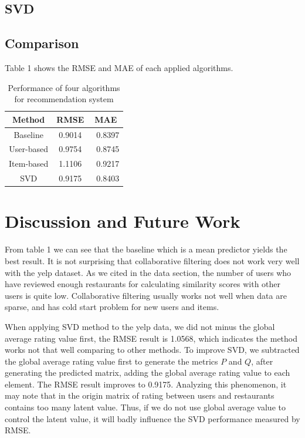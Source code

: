 \documentclass{llncs}
\begin{document}
\subsection{SVD}
\subsection{Comparison}
Table 1 shows the RMSE and MAE of each applied algorithms.
\begin{table}
	\caption{Performance of four algorithms for recommendation system}
	\begin{center}
		\begin{tabular}{ccc}
			\hline
				\rule{0pt}{12pt}Method  & \rule{0pt}{12pt}RMSE   &\rule{0pt}{12pt} MAE\\
			\hline\rule{0pt}{12pt}
			Baseline    &   0.9014 & \ 	0.8397 \\
			User-based  &   0.9754 & \ 	0.8745\\
			Item-based  &   1.1106 & \      0.9217\\
			SVD         &   0.9175 & \      0.8403\\
			\hline
		\end{tabular}
	\end{center}
\end{table}

\section{Discussion and Future Work}
From table 1 we can see that the baseline which is a mean predictor yields the best result. It is not surprising that collaborative filtering does not work very well with the yelp dataset. As we cited in the data section, the number of users who have reviewed enough restaurants for calculating similarity scores with other users is quite low. Collaborative filtering usually works not well when data are sparse, and has cold start problem for new users and items.

When applying SVD method to the yelp data, we did not minus the global average rating value first, the RMSE result is 1.0568, which indicates the method works not that well comparing to other methods. To improve SVD, we subtracted the global average rating value first to generate the metrics $P$ and $Q$, after generating the predicted matrix, adding the global average rating value to each element. The RMSE result improves to  0.9175. Analyzing this phenomenon, it may note that in the origin matrix of rating between users and restaurants contains too many latent value. Thus, if we do not use global average value to control the latent value, it will badly influence the SVD performance measured by RMSE.
 
\end{document}
